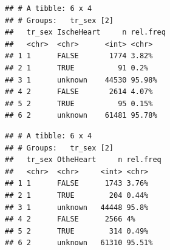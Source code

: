 \documentclass[]{article}
\newenvironment{Shaded}{\begin{snugshade}}{\end{snugshade}}
\newcommand{\DataTypeTok}[1]{\textcolor[rgb]{0.13,0.29,0.53}{#1}}
\newcommand{\DecValTok}[1]{\textcolor[rgb]{0.00,0.00,0.81}{#1}}
\newcommand{\KeywordTok}[1]{\textcolor[rgb]{0.13,0.29,0.53}{\textbf{#1}}}
\newcommand{\NormalTok}[1]{#1}
\newcommand{\OperatorTok}[1]{\textcolor[rgb]{0.81,0.36,0.00}{\textbf{#1}}}
\newcommand{\OtherTok}[1]{\textcolor[rgb]{0.56,0.35,0.01}{#1}}
\newcommand{\StringTok}[1]{\textcolor[rgb]{0.31,0.60,0.02}{#1}}
\begin{document}
\begin{Shaded}
\end{Shaded}

\begin{verbatim}
## # A tibble: 6 x 4
## # Groups:   tr_sex [2]
##   tr_sex IscheHeart     n rel.freq
##   <chr>  <chr>      <int> <chr>   
## 1 1      FALSE       1774 3.82%   
## 2 1      TRUE          91 0.2%    
## 3 1      unknown    44530 95.98%  
## 4 2      FALSE       2614 4.07%   
## 5 2      TRUE          95 0.15%   
## 6 2      unknown    61481 95.78%
\end{verbatim}

\begin{Shaded}
\end{Shaded}

\begin{verbatim}
## # A tibble: 6 x 4
## # Groups:   tr_sex [2]
##   tr_sex OtheHeart     n rel.freq
##   <chr>  <chr>     <int> <chr>   
## 1 1      FALSE      1743 3.76%   
## 2 1      TRUE        204 0.44%   
## 3 1      unknown   44448 95.8%   
## 4 2      FALSE      2566 4%      
## 5 2      TRUE        314 0.49%   
## 6 2      unknown   61310 95.51%
\end{verbatim}
\end{document}
